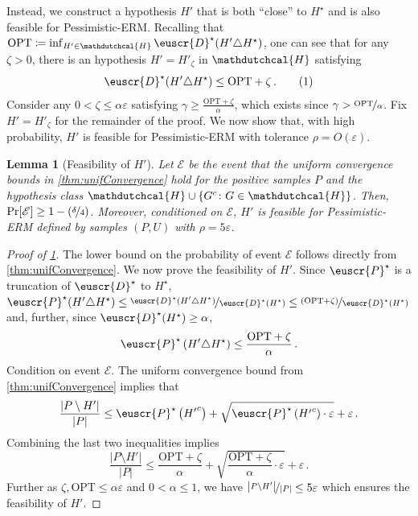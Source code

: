 \documentclass[11pt]{article}
\theoremstyle{plain}
\newtheorem{lemma}[theorem]{Lemma}
\theoremstyle{definition}
\theoremstyle{remark}
\newcommand{\yesnum}{\addtocounter{equation}{1}\tag{\theequation}}
\def\abs#1{\left| #1 \right|}
\newcommand{\sinparen}[1]{(#1)}
\newcommand{\inbrace}[1]{\left\{#1\right\}}
\newcommand{\inparen}[1]{\left(#1\right)}
\newcommand{\evE}{\ensuremath{\mathscr{E}}}
\newcommand{\nfrac}[2]{\nicefrac{#1}{#2}}
\newcommand{\opt}{\ensuremath{\mathrm{OPT}}}
\newcommand{\eps}{\varepsilon}
\newcommand{\customcal}[1]{\euscr{#1}}
\newcommand{\cD}{\customcal{D}}
\newcommand{\cP}{\customcal{P}}
\newcommand{\hypo}[1]{\mathdutchcal{#1}}
\newcommand{\hyH}{\hypo{H}}
\newcommand{\pERM}{Pessimistic-ERM}
\newcommand{\optset}{{H^\star}}
\newcommand{\cDtrue}{\cD^\star}
\newcommand{\cPtrue}{\cP^\star}
\begin{document}
            Instead, we construct a hypothesis $H'$ that is both ``close'' to $\optset$ and is also feasible for \pERM{}.
            Recalling that $\opt\coloneqq \inf_{H'\in \hyH}\cDtrue(H'\triangle \optset)$, one can see that for any $\zeta>0$, there is an hypothesis $H'=H'_\zeta$ in $\hyH$ satisfying
            \[
                \cDtrue\sinparen{H'\triangle \optset} 
                \leq \opt + \zeta\,.
                \yesnum\label{eq:perm:closeToInf}
            \]
            Consider any $0<\zeta\leq \alpha\eps$ satisfying $\gamma \geq \frac{\opt+\zeta}{\alpha}$, which exists since $\gamma > \nfrac{\opt}{\alpha}$.
            Fix $H'=H'_\zeta$ for the remainder of the proof.
            We now show that, with high probability, $H'$ is feasible for \pERM{} with tolerance $\rho=O(\eps)$.
            \begin{lemma}[Feasibility of $H'$]
                \label{lem:sampleComplexity:Hard:feasibility}
                Let $\evE$ be the event that the uniform convergence bounds in \cref{thm:unifConvergence} hold for the positive samples $P$ and the hypothesis class $\hyH\cup\inbrace{G^c\colon G\in \hyH}$.
                Then, $\Pr[\evE]\geq 1-(\nfrac{\delta}{4})$.
                Moreover, conditioned on $\evE$, $H'$ is feasible for \pERM{} defined by samples $(P,U)$ with $\rho=5\eps$.
            \end{lemma}
            \begin{proof}[Proof of \cref{lem:sampleComplexity:Hard:feasibility}]
                The lower bound on the probability of event $\evE$ follows directly from \cref{thm:unifConvergence}.
                We now prove the feasibility of $H'$.
                Since $\cPtrue$ is a truncation of $\cDtrue$ to $\optset$, $ \cPtrue\sinparen{H'\triangle \optset} \leq \nfrac{\cDtrue\sinparen{H'\triangle \optset}}{\cDtrue(\optset)}\leq \nfrac{\inparen{\opt+ \zeta }}{{\cDtrue(\optset)}}$ and, further, since $\cDtrue(\optset)\geq  \alpha $, 
                \[
                    \cPtrue\inparen{H'\triangle \optset} \leq \frac{\opt +  \zeta }{\alpha}\,.
                \]
                Condition on event $\evE$.
                The uniform convergence bound from \cref{thm:unifConvergence} implies that 
                \[
                    \frac{\abs{P\setminus H'}}{\abs{P}}
                    \leq
                        \cPtrue\inparen{{H'}^c}
                        + \sqrt{ \cPtrue\inparen{{H'}^c} \cdot \eps}
                        + \eps\,.
                \]
                Combining the last two inequalities implies
                \[
                    \frac{\abs{P\setminus H'}}{\abs{P}}
                    \leq
                        \frac{\opt +  \zeta }{\alpha}
                        + \sqrt{ \frac{\opt +  \zeta }{\alpha} \cdot \eps}
                        + \eps\,.
                \]
                Further as $\zeta,\opt\leq \alpha\eps$ and $0<\alpha\leq 1$, we have $\nfrac{\abs{P\setminus H'}}{\abs{P}}
                    \leq 5\eps$ which ensures the feasibility of $H'$.
            \end{proof}
\end{document}
